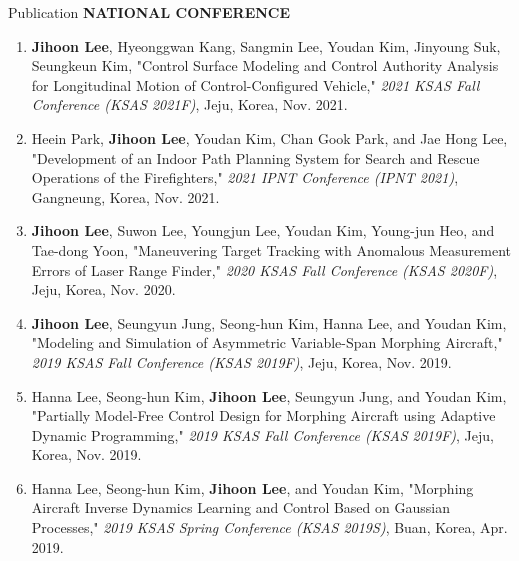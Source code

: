 \documentclass{resume}
\begin{document}
\begin{rSection}{Publication}
	\textbf{NATIONAL CONFERENCE}
	\begin{enumerate}\renewcommand{\labelenumi}{[NC\theenumi]}
		\item \textbf{Jihoon Lee}, Hyeonggwan Kang, Sangmin Lee, Youdan Kim, Jinyoung Suk, Seungkeun Kim, "Control Surface Modeling and Control Authority Analysis for Longitudinal Motion of Control-Configured Vehicle," \textit{2021 KSAS Fall Conference (KSAS 2021F)}, Jeju, Korea, Nov. 2021.
		\newline[\href{https://www.dbpia.co.kr/journal/articleDetail?nodeId=NODE11031427}{Link}] 
		
		\item Heein Park, \textbf{Jihoon Lee}, Youdan Kim, Chan Gook Park, and Jae Hong Lee, "Development of an Indoor Path Planning System for Search and Rescue Operations of the Firefighters," \textit{2021 IPNT Conference (IPNT 2021)}, Gangneung, Korea, Nov. 2021. 
		\newline[\href{http://ipnt.or.kr/2021proc/33?bo_table=2021proc&wr_id=33&rewrite=1&device=pc}{Link}] 
		
		\item \textbf{Jihoon Lee}, Suwon Lee, Youngjun Lee, Youdan Kim, Young-jun Heo, and Tae-dong Yoon, "Maneuvering Target Tracking with Anomalous Measurement Errors of Laser Range Finder," \textit{2020 KSAS Fall Conference (KSAS 2020F)}, Jeju, Korea, Nov. 2020. 
		\newline[\href{https://www.dbpia.co.kr/Journal/articleDetail?nodeId=NODE10442093}{Link}] 
		
		\item \textbf{Jihoon Lee}, Seungyun Jung, Seong-hun Kim, Hanna Lee, and Youdan Kim, "Modeling and Simulation of Asymmetric Variable-Span Morphing Aircraft," \textit{2019 KSAS Fall Conference (KSAS 2019F)}, Jeju, Korea, Nov. 2019. 
		\newline[\href{http://www.dbpia.co.kr/journal/articleDetail?nodeId=NODE09317850}{Link}] 
		
		\item Hanna Lee, Seong-hun Kim, \textbf{Jihoon Lee}, Seungyun Jung, and Youdan Kim, "Partially Model-Free Control Design for Morphing Aircraft using Adaptive Dynamic Programming," \textit{2019 KSAS Fall Conference (KSAS 2019F)}, Jeju, Korea, Nov. 2019. 
		\newline[\href{http://www.dbpia.co.kr/journal/articleDetail?nodeId=NODE09317891}{Link}] 
		
		\item Hanna Lee, Seong-hun Kim, \textbf{Jihoon Lee}, and Youdan Kim, "Morphing Aircraft Inverse Dynamics Learning and Control Based on Gaussian Processes," \textit{2019 KSAS Spring Conference (KSAS 2019S)}, Buan, Korea, Apr. 2019. 
		\newline[\href{http://www.dbpia.co.kr/journal/articleDetail?nodeId=NODE08753032}{Link}] 
		

\end{enumerate}
\end{rSection}
\end{document}

